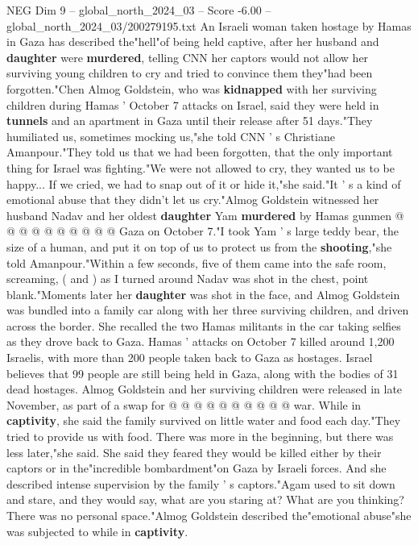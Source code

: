 \begin{textsample}{NEG Dim 9 – global\_north\_2024\_03 – Score -6.00 – global\_north\_2024\_03/200279195.txt}  \label{ex:f9_neg_244}
An Israeli woman taken hostage by Hamas in Gaza has described the"hell"of being held captive, after her husband and \textbf{daughter} were \textbf{murdered}, telling CNN her captors would not allow her surviving young children to cry and tried to convince them they"had been forgotten."Chen Almog Goldstein, who was \textbf{kidnapped} with her surviving children during Hamas ' October 7 attacks on Israel, said they were held in \textbf{tunnels} and an apartment in Gaza until their release after 51 days."They humiliated us, sometimes mocking us,"she told CNN ' s Christiane Amanpour."They told us that we had been forgotten, that the only important thing for Israel was fighting."We were not allowed to cry, they wanted us to be happy...
If we cried, we had to snap out of it or hide it,"she said."It ' s a kind of emotional abuse that they didn't let us cry."Almog Goldstein witnessed her husband Nadav and her oldest \textbf{daughter} Yam \textbf{murdered} by Hamas gunmen @ @ @ @ @ @ @ @ @ @ Gaza on October 7."I took Yam ' s large teddy bear, the size of a human, and put it on top of us to protect us from the \textbf{shooting},"she told Amanpour."Within a few seconds, five of them came into the safe room, screaming, ( and ) as I turned around Nadav was shot in the chest, point blank."Moments later her \textbf{daughter} was shot in the face, and Almog Goldstein was bundled into a family car along with her three surviving children, and driven across the border.
She recalled the two Hamas militants in the car taking selfies as they drove back to Gaza.
Hamas ' attacks on October 7 killed around 1,200 Israelis, with more than 200 people taken back to Gaza as hostages.
Israel believes that 99 people are still being held in Gaza, along with the bodies of 31 dead hostages.
Almog Goldstein and her surviving children were released in late November, as part of a swap for @ @ @ @ @ @ @ @ @ @ war.
While in \textbf{captivity}, she said the family survived on little water and food each day."They tried to provide us with food.
There was more in the beginning, but there was less later,"she said.
She said they feared they would be killed either by their captors or in the"incredible bombardment"on Gaza by Israeli forces.
And she described intense supervision by the family ' s captors."Agam used to sit down and stare, and they would say, what are you staring at?
What are you thinking?
There was no personal space."Almog Goldstein described the"emotional abuse"she was subjected to while in \textbf{captivity}.

\end{textsample}

